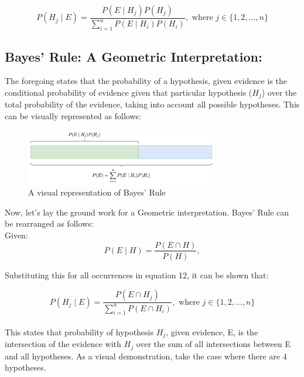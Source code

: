 \documentclass[12pt]{article}
\begin{document}
\begin{equation}
P(H_j \mid E) = \frac{P(E \mid H_j) P(H_j)}{\sum_{i=1}^{n} P(E \mid H_i) P(H_i)}, \text{ where } j \in \{1, 2, \ldots, n\}
\end{equation}

\newpage
\subsection*{Bayes' Rule: A Geometric Interpretation:}
\noindent The foregoing states that the probability of a hypothesis, given evidence is the conditional probability of evidence given that particular hypothesis ($H_j$) over the total probability of the evidence, taking into account all possible hypotheses. This can be visually represented as follows: \\

\begin{figure}[h!]
\centering
\includegraphics[width=0.75\textwidth]{assets/visual_2.png} 
\caption{A visual representation of Bayes' Rule}
\label{fig:cond_prob}
\end{figure}

\noindent Now, let's lay the ground work for a Geometric interpretation. Bayes' Rule can be rearranged as follows:\\

\noindent Given:
\begin{equation}
P(E \mid H) = \frac{P(E \cap H)}{P(H)},
\end{equation}

\noindent Substituting this for all occurrences in equation 12, it can be shown that:

\begin{equation}
P(H_j \mid E) = \frac{P(E \cap H_j)}{\sum_{i=1}^{n} P(E \cap H_i)}, \text{ where } j \in \{1, 2, \ldots, n\}
\end{equation} \\

\noindent This states that probability of hypothesis $H_j$, given evidence, E,  is the intersection of the evidence with $H_j$ over the sum of all intersections between E and all hypotheses. As a visual demonstration, take the case where there are 4 hypotheses.
\end{document}

